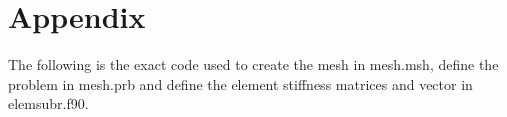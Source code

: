 \documentclass[10pt,a4paper]{article}
\begin{document}
\section{Appendix}
The following is the exact code used to create the mesh in mesh.msh, define the problem in mesh.prb and define the element stiffness matrices and vector in elemsubr.f90.



\end{document}
